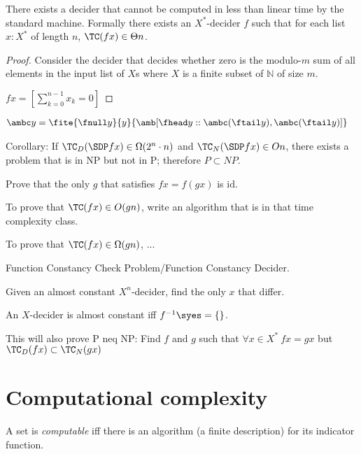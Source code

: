 \begin{mlem}
There exists a decider that cannot be computed
in less than linear time
by the standard machine.
Formally there exists an $X^*$-decider $f$ such that
for each list $x : X^*$ of length $n$,
$\TC(fx) \in \Theta n$.
\begin{proof}
    Consider the decider that decides whether zero
    is the modulo-$m$ sum of all elements in the input list of $X$s
    where $X$ is a finite subset of $\mathbb N$ of size $m$.

    $f x = [\sum_{k=0}^{n-1} x_k = 0]$
\end{proof}
\end{mlem}

    \begin{align}
        \ambc y &= \fite{\fnull y}{y}{\amb[\fhead y :: \ambc (\ftail y), \ambc (\ftail y)]}
    \end{align}

\begin{mcon}
Corollary:
If $\TC_D(\SDP fx) \in \Omega(2^n \cdot n)$ and $\TC_N(\SDP fx) \in O n$,
there exists a problem that is in NP but not in P;
therefore $P \subset NP$.
\end{mcon}

Prove that the only $g$ that satisfies $fx = f(gx)$ is $\text{id}$.

To prove that $\TC (fx) \in O(gn)$,
write an algorithm that is in that time complexity class.

To prove that $\TC (fx) \in \Omega(gn)$, ...


Function Constancy Check Problem/Function Constancy Decider.

Given an almost constant $X^n$-decider, find the only $x$ that differ.

An $X$-decider is almost constant iff $f^{-1}\syes = \{\}$.

This will also prove P neq NP:
Find $f$ and $g$ such that $\forall x \in X^* ~ fx = gx$ but $\TC_D(fx) \subset \TC_N(gx)$









\chapter{Computational complexity}

A set is \emph{computable} iff there is an algorithm (a finite description)
for its indicator function.

